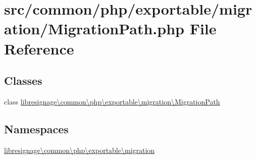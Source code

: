 \hypertarget{MigrationPath_8php}{}\section{src/common/php/exportable/migration/\+Migration\+Path.php File Reference}
\label{MigrationPath_8php}
\subsection*{Classes}
\begin{DoxyCompactItemize}
\item 
class \hyperlink{classlibresignage_1_1common_1_1php_1_1exportable_1_1migration_1_1MigrationPath}{libresignage\textbackslash{}common\textbackslash{}php\textbackslash{}exportable\textbackslash{}migration\textbackslash{}\+Migration\+Path}
\end{DoxyCompactItemize}
\subsection*{Namespaces}
\begin{DoxyCompactItemize}
\item 
 \hyperlink{namespacelibresignage_1_1common_1_1php_1_1exportable_1_1migration}{libresignage\textbackslash{}common\textbackslash{}php\textbackslash{}exportable\textbackslash{}migration}
\end{DoxyCompactItemize}
